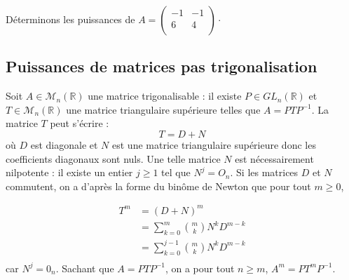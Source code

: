 \documentclass[french,11pt,twoside]{VcCours}
\begin{document}
\begin{Exemple}{} Déterminons les puissances de  $A = \begin{pmatrix}
-1 & -1  \\
 6   &  4 \\
\end{pmatrix} \cdot$

\newpage

\vspace*{5cm}
\end{Exemple}

\subsection{Puissances de matrices pas trigonalisation}
Soit $A \in \mathcal{M}_n(\mathbb{R})$ une matrice trigonalisable : il existe $P \in GL_n(\mathbb{R})$ et $T \in \mathcal{M}_n(\mathbb{R})$ une matrice triangulaire supérieure telles que $A=PTP^{-1}$. La matrice $T$ peut s'écrire :
$$ T = D+ N$$
où $D$ est diagonale et $N$ est une matrice triangulaire supérieure donc les coefficients diagonaux sont nuls. Une telle matrice $N$ est nécessairement nilpotente : il existe un entier $j \geq 1$ tel que $N^j=O_n$. Si les matrices $D$ et $N$ commutent, on a d'après la forme du binôme de Newton que pour tout $m \geq 0$,

\begin{align*}
T^m & = (D+N)^m \\
& = \sum_{k=0}^m \binom{m}{k} N^k D^{m-k} \\
& = \sum_{k=0}^{j-1}\binom{m}{k} N^k D^{m-k} \\ 
\end{align*}
car $N^j=0_n$. Sachant que $A=PTP^{-1}$, on a pour tout $n \geq m$, $A^m=PT^mP^{-1}$.
\end{document}
